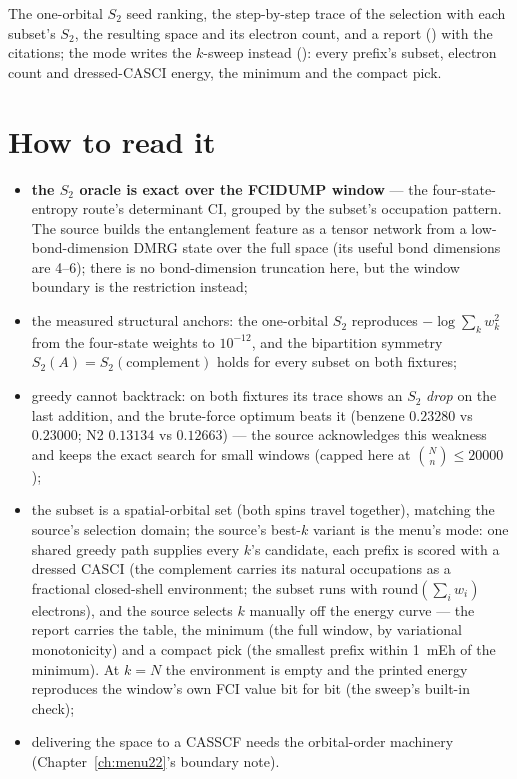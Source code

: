 The one-orbital $S_2$ seed ranking, the step-by-step trace of the selection
with each subset's $S_2$, the resulting space and its electron count, and a
report () with the citations; the 
mode writes the $k$-sweep instead ():
every prefix's subset, electron count and dressed-CASCI energy, the minimum
and the compact pick.

\section{How to read it}

\begin{readbox}
\begin{itemize}
  \item \textbf{the $S_2$ oracle is exact over the FCIDUMP window} --- the
    four-state-entropy route's determinant CI, grouped by the subset's
    occupation pattern.  The source builds the entanglement feature as a
    tensor network from a low-bond-dimension DMRG state over the full space
    (its useful bond dimensions are 4--6); there is no bond-dimension
    truncation here, but the window boundary is the restriction instead;
  \item the measured structural anchors: the one-orbital $S_2$ reproduces
    $-\log\sum_k w_k^2$ from the four-state weights to $10^{-12}$, and the
    bipartition symmetry $S_2(A) = S_2(\text{complement})$ holds for every
    subset on both fixtures;
  \item greedy cannot backtrack: on both fixtures its trace shows an $S_2$
    \emph{drop} on the last addition, and the brute-force optimum beats it
    (benzene $0.23280$ vs $0.23000$; N2 $0.13134$ vs $0.12663$) --- the
    source acknowledges this weakness and keeps the exact search for small
    windows (capped here at $\binom{N}{n} \le 20000$);
  \item the subset is a spatial-orbital set (both spins travel together),
    matching the source's selection domain; the source's best-$k$ variant is
    the menu's  mode: one shared greedy path supplies every $k$'s
    candidate, each prefix is scored with a dressed CASCI (the complement
    carries its natural occupations as a fractional closed-shell environment;
    the subset runs with $\mathrm{round}(\sum_i w_i)$ electrons), and the
    source selects $k$ manually off the energy curve --- the report carries
    the table, the minimum (the full window, by variational monotonicity) and
    a compact pick (the smallest prefix within 1~mEh of the minimum).  At
    $k = N$ the environment is empty and the printed energy reproduces the
    window's own FCI value bit for bit (the sweep's built-in check);
  \item delivering the space to a CASSCF needs the orbital-order machinery
    (Chapter~\ref{ch:menu22}'s boundary note).
\end{itemize}
\end{readbox}
